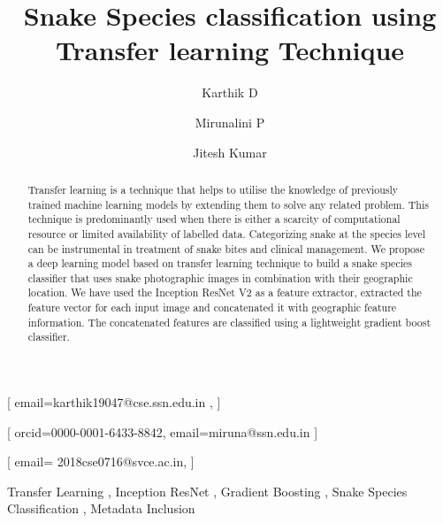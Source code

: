 \documentclass[
]{ceurart}
\begin{document}


\title{Snake Species classification using Transfer learning Technique  }

\author[1]{Karthik D}[%
email=karthik19047@cse.ssn.edu.in ,
]
\address[1]{Department of Computer Science and Engineering,
 Sri Sivasubramaniya Nadar College of Engineering, India}

\author[1]{Mirunalini P}[%
orcid=0000-0001-6433-8842,
email=miruna@ssn.edu.in
]

\author[2]{Jitesh Kumar}[%
email= 2018cse0716@svce.ac.in,
]
\address[2]{Department of Computer Science and Engineering,
Sri Venkateshwara College of Engineering, India}




\begin{abstract}
Transfer learning is a technique that helps to utilise the knowledge of previously trained machine learning models by extending them to solve any related problem. This technique is predominantly used when there is either a scarcity of computational resource or limited availability of labelled data. Categorizing snake at the species level can be instrumental in treatment of snake bites and clinical management. We propose a deep learning model based on transfer learning technique to build a snake species classifier that uses snake photographic images in combination with their geographic location. We have used the Inception ResNet V2 as a feature extractor, extracted the feature vector for each input image and concatenated it with geographic feature information. The concatenated features are classified using a lightweight gradient boost classifier.
\end{abstract}

\begin{keywords}
  Transfer Learning \sep
  Inception ResNet \sep
  Gradient Boosting \sep 
  Snake Species Classification \sep 
  Metadata Inclusion
\end{keywords}
\end{document}
